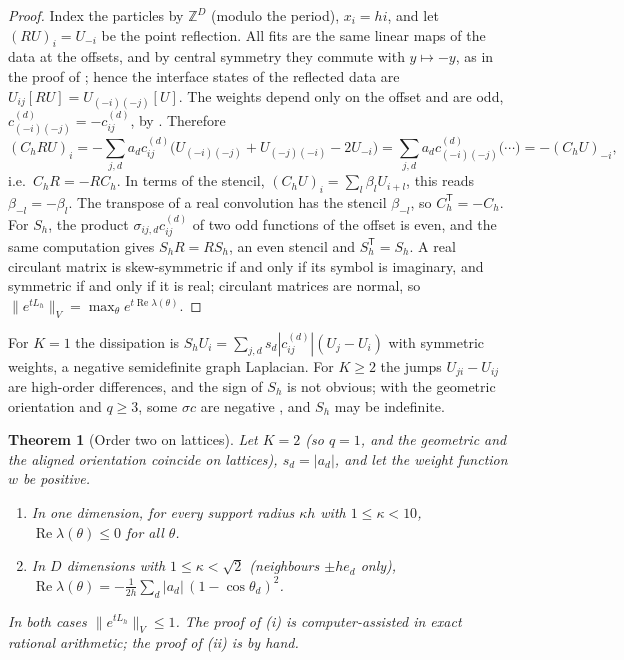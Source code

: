 \documentclass[11pt,a4paper]{article}
\theoremstyle{plain}
\newtheorem{theorem}{Theorem}[section]
\theoremstyle{definition}
\theoremstyle{remark}
\numberwithin{equation}{section}
\renewcommand{\Re}{\operatorname{Re}}
\newcommand{\A}[1]{\cite[#1]{Addendum}}
\begin{document}
\begin{proof}
Index the particles by $\mathbb Z^D$ (modulo the period), $x_i=hi$, and let $(RU)_i=U_{-i}$ be the point reflection. All fits are the same linear maps of the data at the offsets, and by central symmetry they commute with $y\mapsto-y$, as in the proof of \A{Prop.~4.3}; hence the interface states of the reflected data are $U_{ij}[RU]=U_{(-i)(-j)}[U]$. The weights depend only on the offset and are odd, $c^{(d)}_{(-i)(-j)}=-c^{(d)}_{ij}$, by \A{Lem.~3.7(i)}. Therefore
\[
(C_hRU)_i=-\sum_{j,d}a_dc^{(d)}_{ij}\big(U_{(-i)(-j)}+U_{(-j)(-i)}-2U_{-i}\big)=\sum_{j,d}a_dc^{(d)}_{(-i)(-j)}\big(\cdots\big)=-(C_hU)_{-i},
\]
i.e.\ $C_hR=-RC_h$. In terms of the stencil, $(C_hU)_i=\sum_l\beta_lU_{i+l}$, this reads $\beta_{-l}=-\beta_l$. The transpose of a real convolution has the stencil $\beta_{-l}$, so $C_h^{\mathsf T}=-C_h$. For $S_h$, the product $\sigma_{ij,d}c^{(d)}_{ij}$ of two odd functions of the offset is even, and the same computation gives $S_hR=RS_h$, an even stencil and $S_h^{\mathsf T}=S_h$. A real circulant matrix is skew-symmetric if and only if its symbol is imaginary, and symmetric if and only if it is real; circulant matrices are normal, so $\|e^{tL_h}\|_V=\max_\theta e^{t\Re\lambda(\theta)}$.
\end{proof}

For $K=1$ the dissipation is $S_hU_i=\sum_{j,d}s_d|c^{(d)}_{ij}|(U_j-U_i)$ with symmetric weights, a negative semidefinite graph Laplacian. For $K\ge2$ the jumps $U_{ji}-U_{ij}$ are high-order differences, and the sign of $S_h$ is not obvious; with the geometric orientation and $q\ge3$, some $\sigma c$ are negative \A{Rem.~5.4(i)}, and $S_h$ may be indefinite.

\begin{theorem}[Order two on lattices]\label{thm:k2}
Let $K=2$ (so $q=1$, and the geometric and the aligned orientation coincide on lattices), $s_d=|a_d|$, and let the weight function $w$ be positive.
\begin{enumerate}[label=(\roman*)]
\item In one dimension, for every support radius $\kappa h$ with $1\le\kappa<10$, $\Re\lambda(\theta)\le0$ for all $\theta$.
\item In $D$ dimensions with $1\le\kappa<\sqrt2$ (neighbours $\pm he_d$ only), $\Re\lambda(\theta)=-\frac{1}{2h}\sum_d|a_d|\,(1-\cos\theta_d)^2$.
\end{enumerate}
In both cases $\|e^{tL_h}\|_V\le1$. The proof of (i) is computer-assisted in exact rational arithmetic; the proof of (ii) is by hand.
\end{theorem}
\end{document}
